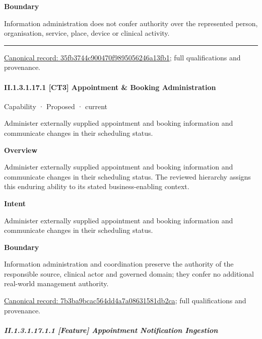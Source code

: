 \textbf{Boundary}



Information administration does not confer authority over the represented person, organisation, service, place, device or clinical activity.



\medskip\hrule\medskip

{\footnotesize \href{../../../../continuum/strategy/capability/35fb3744c900470f9895056246a13fb1.md}{Canonical record: 35fb3744c900470f9895056246a13fb1}; full qualifications and provenance.}\par
\paragraph*{II.1.3.1.17.1 [CT3] Appointment \& Booking Administration}
\label{navigation:II.1.3.1.17.1}

\label{element:7b3ba9bcac564dd4a7a08631581db2ca}
{\small Capability · Proposed · current}\par

Administer externally supplied appointment and booking information and communicate changes in their scheduling status.



\textbf{Overview}



Administer externally supplied appointment and booking information and communicate changes in their scheduling status. The reviewed hierarchy assigns this enduring ability to its stated business-enabling context.



\textbf{Intent}



Administer externally supplied appointment and booking information and communicate changes in their scheduling status.



\textbf{Boundary}



Information administration and coordination preserve the authority of the responsible source, clinical actor and governed domain; they confer no additional real-world management authority.


{\footnotesize \href{../../../../continuum/strategy/capability/7b3ba9bcac564dd4a7a08631581db2ca.md}{Canonical record: 7b3ba9bcac564dd4a7a08631581db2ca}; full qualifications and provenance.}\par
\subparagraph*{II.1.3.1.17.1.1 [Feature] Appointment Notification Ingestion}
\label{navigation:II.1.3.1.17.1.1}

